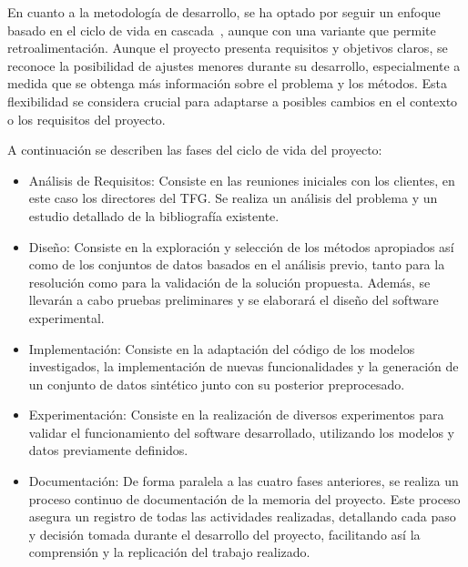 En cuanto a la metodología de desarrollo, se ha optado por seguir un enfoque basado en el ciclo de vida en cascada~\cite{38}, aunque con una variante que permite retroalimentación. Aunque el proyecto presenta requisitos y objetivos claros, se reconoce la posibilidad de ajustes menores durante su desarrollo, especialmente a medida que se obtenga más información sobre el problema y los métodos. Esta flexibilidad se considera crucial para adaptarse a posibles cambios en el contexto o los requisitos del proyecto.

A continuación se describen las fases del ciclo de vida del proyecto:
\begin{itemize}
	\item Análisis de Requisitos: Consiste en las reuniones iniciales con los clientes, en este caso los directores del TFG. Se realiza un análisis del problema y un estudio detallado de la bibliografía existente.
	\item Diseño: Consiste en la exploración y selección de los métodos apropiados así como de los conjuntos de datos basados en el análisis previo, tanto para la resolución como para la validación de la solución propuesta. Además, se llevarán a cabo pruebas preliminares y se elaborará el diseño del software experimental.
	\item Implementación: Consiste en la adaptación del código de los modelos investigados, la implementación de nuevas funcionalidades y la generación de un conjunto de datos sintético junto con su posterior preprocesado.
	\item Experimentación: Consiste en la realización de diversos experimentos para validar el funcionamiento del software desarrollado, utilizando los modelos y datos previamente definidos.
	\item Documentación: De forma paralela a las cuatro fases anteriores, se realiza un proceso continuo de documentación de la memoria del proyecto. Este proceso asegura un registro de todas las actividades realizadas, detallando cada paso y decisión tomada durante el desarrollo del proyecto, facilitando así la comprensión y la replicación del trabajo realizado.
\end{itemize}

